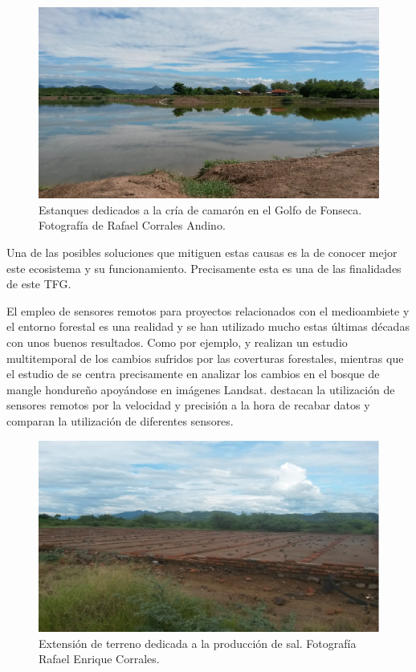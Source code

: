 \begin{figure}
	\centering
	\includegraphics[width=0.9\linewidth]{./Imagenes/Camaronera2.eps}
	\caption[Estanques de cría de camarón]{Estanques dedicados a la cría de camarón en el Golfo de Fonseca. Fotografía de Rafael Corrales Andino.}
	\label{fig:camaroneras}
\end{figure}

Una de las posibles soluciones que mitiguen estas causas es la de conocer mejor este ecosistema y su funcionamiento. Precisamente esta es una de las finalidades de este \ac{TFG}.\Sep

El empleo de sensores remotos para proyectos relacionados con el medioambiete y el entorno forestal es una realidad y se han utilizado mucho estas últimas décadas con unos buenos resultados. Como por ejemplo, \cite{bodart2011pre} y \cite{cajacuri2011medicion} realizan un estudio multitemporal de los cambios sufridos por las coverturas forestales, mientras que el estudio de \cite{chen2013multi} se centra precisamente en analizar los cambios en el bosque de mangle hondureño apoyándose en imágenes Landsat. \cite{lee2009applying} destacan la utilización de sensores remotos por la velocidad y precisión a la hora de recabar datos y comparan la utilización de diferentes sensores.\Sep

\begin{figure}
	\centering
	\includegraphics[width=0.9\linewidth]{./Imagenes/Salineras.eps}
	\caption[Salineras]{Extensión de terreno dedicada a la producción de sal. Fotografía Rafael Enrique Corrales.}
	\label{fig:salinas}
\end{figure}

